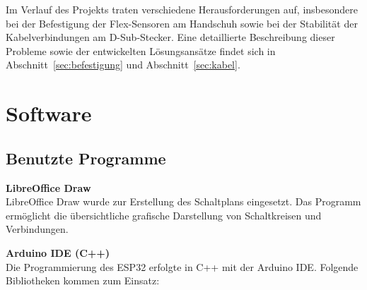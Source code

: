 \documentclass[12pt,a4paper]{article}
\begin{document}
Im Verlauf des Projekts traten verschiedene Herausforderungen auf, insbesondere 
bei der Befestigung der Flex-Sensoren am Handschuh sowie bei der Stabilität 
der Kabelverbindungen am D-Sub-Stecker. Eine detaillierte Beschreibung dieser 
Probleme sowie der entwickelten Lösungsansätze findet sich in Abschnitt~\ref{sec:befestigung} 
und Abschnitt~\ref{sec:kabel}.

\section{Software}

\subsection{Benutzte Programme}

\textbf{LibreOffice Draw} \\
LibreOffice Draw wurde zur Erstellung des Schaltplans eingesetzt. Das Programm 
ermöglicht die übersichtliche grafische Darstellung von Schaltkreisen und 
Verbindungen.

\vspace{0.5em}
\textbf{Arduino IDE (C++)} \\
Die Programmierung des ESP32 erfolgte in C++ mit der Arduino IDE. Folgende 
Bibliotheken kommen zum Einsatz:
\end{document}
